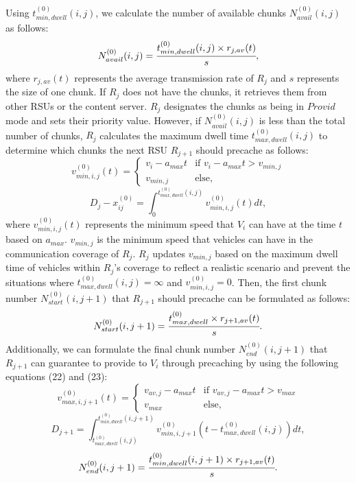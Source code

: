 \documentclass[journal]{IEEEtran}
\begin{document}
Using $t^{(0)}_{min, dwell}(i,j)$, we calculate the number of available chunks $N^{(0)}_{avail}(i,j)$ as follows: %
\begin{equation}
    N^{(0)}_{avail}(i,j)=\cfrac{t^{(0)}_{min, dwell}(i,j)\times r_{j, av}(t)}
    {s},
\end{equation}
where $r_{j, av}(t)$ represents the average transmission rate of $R_{j}$ and $s$ represents the size of one chunk.
If $R_{j}$ does not have the chunks, it retrieves them from other RSUs or the content server.
$R_{j}$ designates the chunks as being in $Provid$ mode and sets their priority value.
However, if $N^{(0)}_{avail}(i,j)$ is less than the total number of chunks, $R_{j}$ calculates the maximum dwell time $t^{(0)}_{max, dwell}(i,j)$ to determine which chunks the next RSU $R_{j+1}$ should precache as follows:
\begin{equation}
    v^{(0)}_{min, i, j}(t)=\begin{cases}
        v_{i}-a_{max}t & \text{if } v_{i}-a_{max}t > v_{min, j}\\
        v_{min, j} & \text{else},
    \end{cases}
\end{equation}
\begin{equation}
    D_{j}-x^{(0)}_{ij}=\int^{t^{(0)}_{max, dwell}(i,j)}_{0} v^{(0)}_{min, i, j}(t) dt,
\end{equation}
where $v^{(0)}_{min, i, j}(t)$ represents the minimum speed that $V_{i}$ can have at the time $t$ based on $a_{max}$.
$v_{min, j}$ is the minimum speed that vehicles can have in the communication coverage of $R_{j}$.
$R_{j}$ updates $v_{min, j}$ based on the maximum dwell time of vehicles within $R_{j}$'s coverage to reflect a realistic scenario and prevent the situations where $t^{(0)}_{max, dwell}(i,j)=\infty$ and $v^{(0)}_{min, i, j}=0$.
Then, the first chunk number $N^{(0)}_{start}(i,j+1)$ that $R_{j+1}$ should precache can be formulated as follows:
\begin{equation}
    N^{(0)}_{start}(i,j+1) = \cfrac{t^{(0)}_{max, dwell}\times r_{j+1, av}(t)}
    {s}.
\end{equation}
Additionally, we can formulate the final chunk number $N^{(0)}_{end}(i, j+1)$ that $R_{j+1}$ can guarantee to provide to $V_i$ through precaching by using the following equations (22) and (23):
\begin{equation}
    v^{(0)}_{max, i, j+1}(t)=\begin{cases}
        v_{av, j}-a_{max}t & \text{if } v_{av, j}-a_{max}t > v_{max}\\
        v_{max} & \text{else},
    \end{cases}
\end{equation}
\begin{equation}
    D_{j+1}=\int^{t^{(0)}_{min, dwell}(i,j+1)}_{t^{(0)}_{max, dwell}(i,j)} v^{(0)}_{min, i, j+1}(t-t^{(0)}_{max, dwell}(i,j)) dt,
\end{equation}
\begin{equation}
    N^{(0)}_{end}(i, j+1)=\cfrac{t^{(0)}_{min, dwell}(i,j+1)\times r_{j+1, av}(t)}{s}.
\end{equation}
\end{document}
